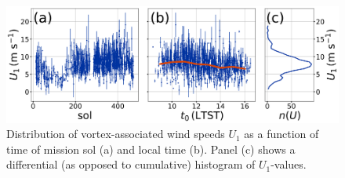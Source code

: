 \documentclass[linenumbers,trackchanges]{aastex63}
\begin{document}

\begin{figure}
    \centering
    \includegraphics[width=\textwidth]{figures/U1_vs_t0-sol_hist.png}
    \caption{Distribution of vortex-associated wind speeds $U_1$ as a function of time of mission sol (a) and local time (b). Panel (c) shows a differential (as opposed to cumulative) histogram of $U_1$-values.}
    \label{fig:U_vs_t0-sol_hist}
\end{figure}
\end{document}
